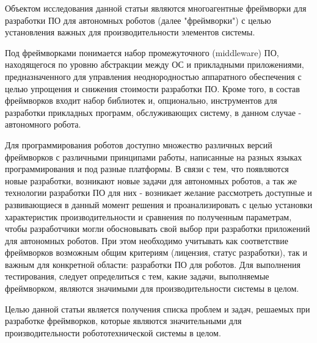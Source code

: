 Объектом исследования данной статьи являются многоагентные фреймворки для разработки ПО для автономных роботов (далее "фреймворки") с целью установления важных для производительности элементов системы.

Под фреймворками понимается набор промежуточного (middleware) ПО, находящегося по уровню абстракции между ОС и прикладными приложениями, предназначенного для управления неоднородностью аппаратного обеспечения с целью упрощения и снижения стоимости разработки ПО.
Кроме того, в состав фреймворков входит набор библиотек и, опционально, инструментов для разработки прикладных программ, обслуживающих систему, в данном случае - автономного робота.

Для программирования роботов доступно множество различных версий фреймворков с различными принципами работы, написанные на разных языках программирования и под разные платформы. В связи с тем, что появляются новые разработки, возникают новые задачи для автономных роботов, а так же технологии разработки ПО для них - возникает желание рассмотреть доступные и развивающиеся в данный момент решения и проанализировать с целью установки характеристик производительности и сравнения по полученным параметрам, чтобы разработчики могли обосновывать свой выбор при разработки приложений для автономных роботов. При этом необходимо учитывать как соответствие фреймворков возможным общим критериям (лицензия, статус разработки), так и важным для конкретной области: разработки ПО для роботов. Для выполнения тестирования, следует определиться с тем, какие задачи, выполняемые фреймворком, являются значимыми для производительности системы в целом.

Целью данной статьи является получения списка проблем и задач, решаемых при разработке фреймворков, которые являются значительными для производительности робототехнической системы в целом.